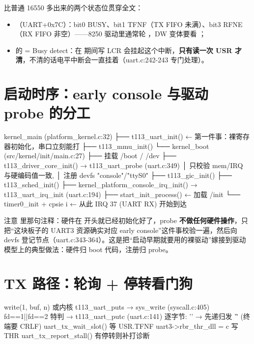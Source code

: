 比普通 16550 多出来的两个状态位贯穿全文：

\begin{itemize}
  \item {}（UART+0x7C）：bit0 BUSY、bit1 TFNF（TX FIFO 未满）、bit3 RFNE（RX FIFO 非空）——8250 驱动里通常轮 ，DW 变体要看 ；
  \item {} 的  = Busy detect：在  期间写 LCR 会挂起这个中断，\textbf{只有读一次 USR 才清}，不清的话电平中断会一直挂着（uart.c:242-243 专门处理）。
\end{itemize}

\section{启动时序：early console 与驱动 probe 的分工}

\begin{txtcode}
kernel_main (platform_kernel.c:32)
├── t113_uart_init()          ← 第一件事：裸寄存器初始化，串口立刻能打
├── t113_mmu_init()
└── kernel_boot (src/kernel/init/main.c:27)
    ├── 挂载 /boot / /dev
    ├── t113_driver_core_init()   → t113_uart_probe (uart.c:349)
    │                                 只校验 mem/IRQ 与硬编码值一致,
    │                                 注册 devfs "console"/"ttyS0"
    ├── t113_gic_init()
    ├── t113_sched_init()
    ├── kernel_platform_console_irq_init()  → t113_uart_irq_init (uart.c:194)
    ├── start_init_process()      ← 加载 /init
    └── timer0_init + cpsie i     ← 从此 IRQ 37 (UART RX) 开始到达
\end{txtcode}

注意  里那句注释：硬件在  开头就已经初始化好了，probe \textbf{不做任何硬件操作}，只把``这块板子的 UART3 资源确实对应 early console''这件事校验一遍，然后向 devfs 登记节点（uart.c:343-364）。这是把``启动早期就要用的裸驱动''嫁接到驱动模型上的典型做法：硬件归 boot 代码，注册归 probe。

\section{TX 路径：轮询 + 停转看门狗}

\begin{txtcode}
write(1, buf, n)  或内核 t113_uart_puts
  → sys_write (syscall.c:405)  fd==1||fd==2 特判
    → t113_uart_putc (uart.c:141)  逐字节:
        '\n' → 先递归发 '\r'                  (终端要 CRLF)
        uart_tx_wait_slot()                    等 USR.TFNF
        uart3->rbr_thr_dll = c                 写 THR
        uart_tx_report_stall()                 有停转则补打诊断
\end{txtcode}

